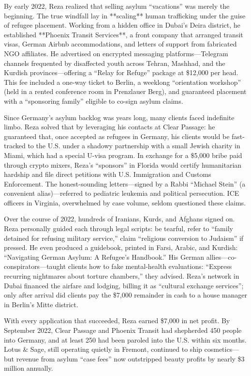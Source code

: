 By early 2022, Reza realized that selling asylum “vacations” was merely the beginning. The true windfall lay in **scaling** human trafficking under the guise of refugee placement. Working from a hidden office in Dubai’s Deira district, he established **Phoenix Transit Services**, a front company that arranged transit visas, German Airbnb accommodations, and letters of support from fabricated NGO affiliates. He advertised on encrypted messaging platforms—Telegram channels frequented by disaffected youth across Tehran, Mashhad, and the Kurdish provinces—offering a “Relay for Refuge” package at \$12,000 per head. This fee included a one-way ticket to Berlin, a weeklong “orientation workshop” (held in a rented conference room in Prenzlauer Berg), and guaranteed placement with a “sponsoring family” eligible to co-sign asylum claims.

Since Germany’s asylum backlog was years long, many clients faced indefinite limbo. Reza solved that by leveraging his contacts at Clear Passage: he guaranteed that, once accepted as refugees in Germany, his clients would be fast-tracked to the U.S. under a shadowy partnership with a small Jewish charity in Miami, which had a special U-visa program. In exchange for a \$5,000 bribe paid through crypto mixers, Reza’s “sponsors” in Florida would certify humanitarian hardship and file direct petitions with U.S. Immigration and Customs Enforcement. The honest-sounding letters—signed by a Rabbi “Michael Stein” (a convenient alias)—referred to pediatric leukemia and political persecution. ICE officers in Virginia, overwhelmed by case volume, seldom questioned these claims.

Over the course of 2022, hundreds of Iranians, Kurds, and Afghans signed on. Reza personally guided each through legal scripts: be tearful, refer to “family detained for refusing military service,” claim “religious conversion to Judaism” if pressed. He even produced a guidebook, printed in Farsi, Arabic, and Kurdish: “Navigating German Asylum: A Refugee’s Handbook.” His German allies—co-conspirators—taught clients how to fake mental-health evaluations: “Express recurring nightmares about torture chambers,” they advised. Reza’s network in Dubai financed the airfare and lodging, billing it as “cultural exchange services”; only after arrival did clients pay the \$7,000 remainder in cash to a house manager in Berlin’s Mitte district.

With every application that succeeded, Reza earned \$7,000 in net profit. By September 2022, Clear Passage and Phoenix Transit had shepherded 450 people into Germany, and at least 250 had been paroled into the U.S. within six months. Lotus \& Sage, still operating quietly in Fremont, continued to ship cosmetics—but revenue from asylum “case fees” now outstripped beauty profits by nearly \$3 million annually.

